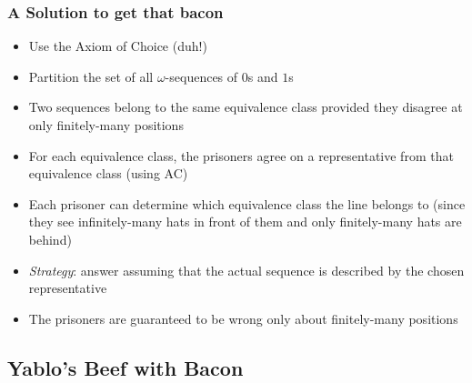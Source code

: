 \begin{frame}
\frametitle{A Solution to get that bacon}

\begin{itemize}[<+->]
\item Use the Axiom of Choice (duh!)

\item Partition the set of all $\omega$-sequences of $0$s and $1$s

\item Two sequences belong to the same equivalence class provided they disagree at only finitely-many positions

\item For each equivalence class, the prisoners agree on a representative from that equivalence class (using AC)

\item Each prisoner can determine which equivalence class the line belongs to (since they see infinitely-many hats in front of them and only finitely-many hats are behind)

\item \textit{Strategy}: answer assuming that the actual sequence is described by the chosen representative

\item The prisoners are guaranteed to be wrong only about finitely-many positions


\end{itemize}
\end{frame}

\fi 




\subsection{Yablo's Beef with Bacon}



